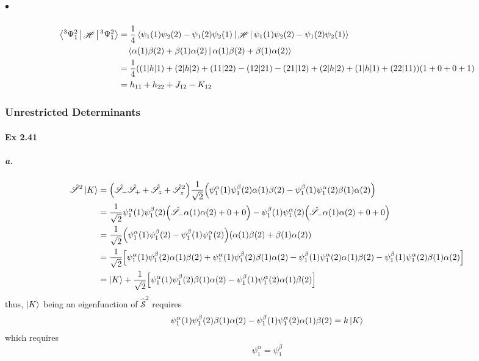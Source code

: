 \documentclass[a4paper]{article}
\DeclareMathOperator{\sH}{\mathscr{H}}
\newcommand{\hsS}{\hat{\mathscr{S}}}
\newcommand{\ex}[1]{\paragraph{Ex #1}}
\newcommand{\subex}[1]{\subparagraph{#1}}
\numberwithin{equation}{subsection}
\begin{document}
\subex{$ \bullet $}
\begin{align}
\Braket{^3\Psi_1^2 | \sH | ^3\Psi_1^2} &= \dfrac{1}{4} \Braket{\psi_1(1)\psi_2(2) - \psi_1(2)\psi_2(1) | \sH | \psi_1(1)\psi_2(2) - \psi_1(2)\psi_2(1)} \notag\\
&\quad{} \Braket{\alpha(1)\beta(2) + \beta(1)\alpha(2) | \alpha(1)\beta(2) + \beta(1)\alpha(2)}\notag\\
&= \dfrac{1}{4}((1|h|1) + (2|h|2) + (11|22) - (12|21) - (21|12) + (2|h|2) + (1|h|1) + (22|11) ) (1 + 0 + 0 + 1) \notag\\
&= h_{11} + h_{22} + J_{12} - K_{12}
\end{align}

\subsubsection{Unrestricted Determinants}
\ex{2.41}
\subex{a.}
\begin{align}
\hsS^2\ket{K} &= \qty(\hsS_-\hsS_+ + \hsS_z + \hsS_z^2) \dfrac{1}{\sqrt{2}} \qty(\psi_1^\alpha(1)\psi_1^\beta(2)\alpha(1)\beta(2) - \psi_1^\beta(1)\psi_1^\alpha(2)\beta(1)\alpha(2))\notag \\
&= \dfrac{1}{\sqrt{2}} \psi_1^\alpha(1)\psi_1^\beta(2) \qty(\hsS_-\alpha(1)\alpha(2) + 0 + 0) - \psi_1^\beta(1)\psi_1^\alpha(2) \qty(\hsS_-\alpha(1)\alpha(2) + 0 + 0) \notag\\
&= \dfrac{1}{\sqrt{2}} \qty(\psi_1^\alpha(1)\psi_1^\beta(2) - \psi_1^\beta(1)\psi_1^\alpha(2)) \qty(\alpha(1)\beta(2) + \beta(1)\alpha(2)) \notag\\
&= \dfrac{1}{\sqrt{2}} \qty[\psi_1^\alpha(1)\psi_1^\beta(2)\alpha(1)\beta(2) 
+ \psi_1^\alpha(1)\psi_1^\beta(2)\beta(1)\alpha(2) %
- \psi_1^\beta(1)\psi_1^\alpha(2)\alpha(1)\beta(2) 
- \psi_1^\beta(1)\psi_1^\alpha(2)\beta(1)\alpha(2)] \notag\\
&= \ket{K} + \dfrac{1}{\sqrt{2}} \qty[\psi_1^\alpha(1)\psi_1^\beta(2)\beta(1)\alpha(2) 
- \psi_1^\beta(1)\psi_1^\alpha(2)\alpha(1)\beta(2)]
\end{align}
thus, $ \ket{K} $ being an eigenfunction of $ \hsS^2 $ requires
\begin{align}
\psi_1^\alpha(1)\psi_1^\beta(2)\beta(1)\alpha(2) 
- \psi_1^\beta(1)\psi_1^\alpha(2)\alpha(1)\beta(2) = k\ket{K}
\end{align}
which requires
\begin{equation}\label{key}
\psi_1^\alpha = \psi_1^\beta
\end{equation}
\end{document}
